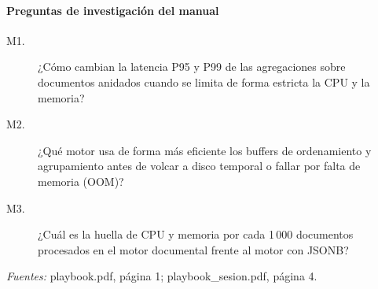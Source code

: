 
\paragraph{Preguntas de investigación del manual}
\begin{description}
\item[M1.] ¿Cómo cambian la latencia P95 y P99 de las
agregaciones sobre documentos anidados cuando se limita
de forma estricta la CPU y la memoria?

\item[M2.] ¿Qué motor usa de forma más eficiente los
buffers de ordenamiento y agrupamiento antes de volcar
a disco temporal o fallar por falta de memoria (OOM)?

\item[M3.] ¿Cuál es la huella de CPU y memoria por cada
1\,000 documentos procesados en el motor documental
frente al motor con JSONB?
\end{description}

\noindent\textit{Fuentes:} playbook.pdf, página 1;
playbook\_sesion.pdf, página 4.

